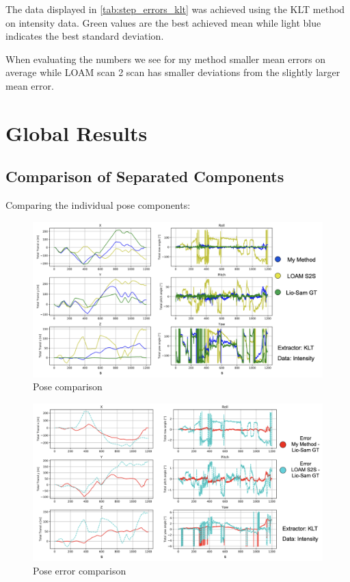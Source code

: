 {{        The data displayed in \cref{tab:step_errors_klt} was achieved using the KLT method on intensity data. Green values are the best achieved mean while light blue indicates the best standard deviation.   

        When evaluating the numbers we see for my method smaller mean errors on average while LOAM scan 2 scan has smaller deviations from the slightly larger mean error.

        
    }

\section{Global Results}{
    \subsection{Comparison of Separated Components}{

    Comparing the individual pose components:

        \begin{figure}[ht]
            \centering
            \includegraphics[scale = 0.25]{images/results/pose_klt.png}
            \caption{Pose comparison}
            \label{fig:pose_comparison_klt}
        \end{figure}

        \begin{figure}[ht]
            \centering
            \includegraphics[scale = 0.25]{images/results/pose_error_klt.png}
            \caption{Pose error comparison}
            \label{fig:pose_error_comparison_klt}
        \end{figure}

}}}
